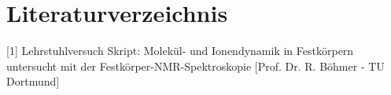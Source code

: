 \section*{Literaturverzeichnis}
[1] Lehrstuhlversuch Skript: Molekül- und Ionendynamik in Festkörpern
untersucht mit der Festkörper-NMR-Spektroskopie
[Prof. Dr. R. Böhmer - TU Dortmund]





